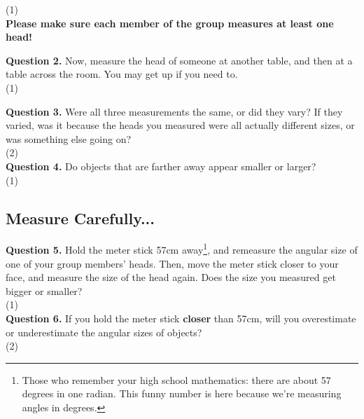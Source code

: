 \documentclass[11pt]{article}
\begin{document}
\vspace*{1.5cm}
(1) \hrulefill\\
\textbf{Please make sure each member of the group measures at least one head!}

\textbf{Question 2.} Now, measure the head of someone at another table, and then at a table across the room. You may get up if you need to.\\

\vspace{1.5cm}
(1) \hrulefill

\newpage

\textbf{Question 3.} Were all three measurements the same, or did they vary? If they varied, was it because the heads you measured were all actually different sizes, or was something else going on?\\

\vspace{1.5cm}
(2) \hrulefill\\

\textbf{Question 4.} Do objects that are farther away appear smaller or larger?\\

\vspace{1.5cm}
(1) \hrulefill\\

\subsection{Measure Carefully...}

\textbf{Question 5.} Hold the meter stick 57cm away\footnote{Those who remember your high school mathematics: there are about 57 degrees in one radian. This funny number is here because we're measuring angles in degrees.}, and remeasure the angular size of one of your group members' heads. Then, move the meter stick closer to your face, and measure the size of the head again. Does the size you measured get bigger or smaller?\\ 

\vspace{1.5cm}
(1) \hrulefill\\

\textbf{Question 6.} If you hold the meter stick \textbf{closer} than 57cm, will you overestimate or underestimate the angular sizes of objects?\\

\vspace{1.5cm}
(2) \hrulefill
\end{document}
